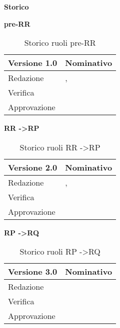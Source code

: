 \newpage

\Large{\textbf{Storico }}\\
\normalsize

\textbf{pre-RR}

\begin{table}[h]
\begin{center}

\begin{tabular}{p{} p{}}
\toprule
\textbf{Versione 1.0}	&	\textbf{Nominativo}\\
\midrule
\midrule
Redazione	&	\VP, \EZ \\
\midrule
Verifica &	\FZ	\\
\midrule
Approvazione	&	\DC	\\
\bottomrule
\end{tabular}
\caption{Storico ruoli pre-RR}
\label{tabVers1}
\end{center}
\end{table}


\textbf{RR -\textgreater RP}

\begin{table}[h]
\begin{center}

\begin{tabular}{p{} p{}}
\toprule
\textbf{Versione 2.0}	&	\textbf{Nominativo}\\
\midrule
\midrule
Redazione	&	\AB, \FZ \\
\midrule
Verifica &	\MB	\\
\midrule
Approvazione	&	\DC	\\
\bottomrule
\end{tabular}
\caption{Storico ruoli RR -\textgreater RP}
\label{tabVers2}
\end{center}
\end{table}

\textbf{RP -\textgreater RQ}

\begin{table}[h]
\begin{center}

\begin{tabular}{p{} p{}}
\toprule
\textbf{Versione 3.0}	&	\textbf{Nominativo}\\
\midrule
\midrule
Redazione	&	\SL\\
\midrule
Verifica &	\EZ	\\
\midrule
Approvazione	&	\FZ	\\
\bottomrule
\end{tabular}
\caption{Storico ruoli RP -\textgreater RQ}
\label{tabVers3}
\end{center}
\end{table}


